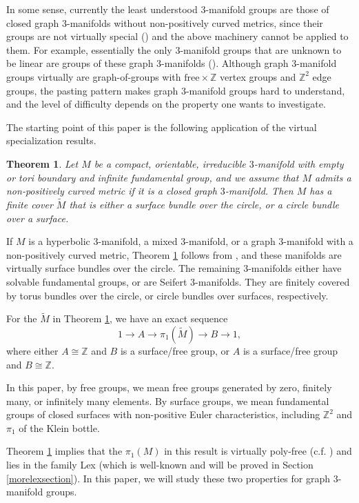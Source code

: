 \documentclass{amsart}
\numberwithin{equation}{section}
\newtheorem{theorem}{Theorem}[section]
\theoremstyle{definition}
\begin{document}
In some sense, currently the least understood $3$-manifold groups are those of closed graph $3$-manifolds without non-positively curved metrics, since their groups are not virtually special (\cite{Liu}) and the above machinery cannot be applied to them. For example, essentially the only $3$-manifold groups that are unknown to be linear are groups of these graph $3$-manifolds (\cite[Problem 3.37]{BKR}). Although graph $3$-manifold groups virtually are graph-of-groups with $\text{free}\times \mathbb{Z}$ vertex groups and $\mathbb{Z}^2$ edge groups, the pasting pattern makes graph $3$-manifold groups hard to understand, and the level of difficulty depends on the property one wants to investigate.

The starting point of this paper is the following application of the virtual specialization results.
\begin{theorem}\label{virtualfiber}
Let $M$ be a compact, orientable, irreducible $3$-manifold with empty or tori boundary and infinite fundamental group, and we assume that $M$ admits a non-positively curved metric if it is a closed graph $3$-manifold. Then $M$ has a finite cover $\tilde{M}$ that is either a surface bundle over the circle, or a circle bundle over a surface.
\end{theorem}

If $M$ is a hyperbolic $3$-manifold, a mixed $3$-manifold, or a graph $3$-manifold with a non-positively curved metric, Theorem \ref{virtualfiber} follows from \cite[(H.20)]{AFW}, and these manifolds are virtually surface bundles over the circle. The remaining $3$-manifolds either have solvable fundamental groups, or are Seifert $3$-manifolds. They are finitely covered by torus bundles over the circle, or circle bundles over surfaces, respectively. 

For the $\tilde{M}$ in Theorem \ref{virtualfiber}, we have an exact sequence $$1\to A\to \pi_1(\tilde{M})\to B\to 1,$$ where either $A\cong \mathbb{Z}$ and $B$ is a surface/free group, or $A$ is a surface/free group and $B\cong \mathbb{Z}$. 

In this paper, by free groups, we mean free groups generated by zero, finitely many, or infinitely many elements. By surface groups, we mean fundamental groups of closed surfaces with non-positive Euler characteristics, including $\mathbb{Z}^2$ and $\pi_1$ of the Klein bottle.

Theorem \ref{virtualfiber} implies that the $\pi_1(M)$ in this result is virtually poly-free (c.f. \cite[(H.30)]{AFW}) and lies in the family Lex (which is well-known and will be proved in Section \ref{morelexsection}). In this paper, we will study these two properties for graph $3$-manifold groups.
\end{document}
